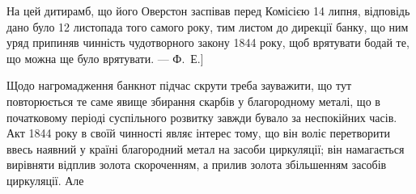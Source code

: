 На цей дитирамб, що його Оверстон заспівав перед Комісією 14 липня,
відповідь дано було 12 листопада того самого року, тим листом до дирекції
банку, що ним уряд припиняв чинність чудотворного закону 1844 року, щоб
врятувати бодай те, що можна ще було врятувати. — Ф.~Е.]


Щодо нагромадження банкнот підчас скрути треба зауважити, що тут повторюється
те саме явище збирання скарбів у благородному металі, що в початковому
періоді суспільного розвитку завжди бувало за неспокійних часів. Акт
1844 року в своїй чинності являє інтерес тому, що він воліє перетворити ввесь
наявний у країні благородний метал на засоби циркуляції; він намагається вирівняти
відплив золота скороченням, а прилив золота збільшенням засобів циркуляції. Але
\parbreak{}  %
